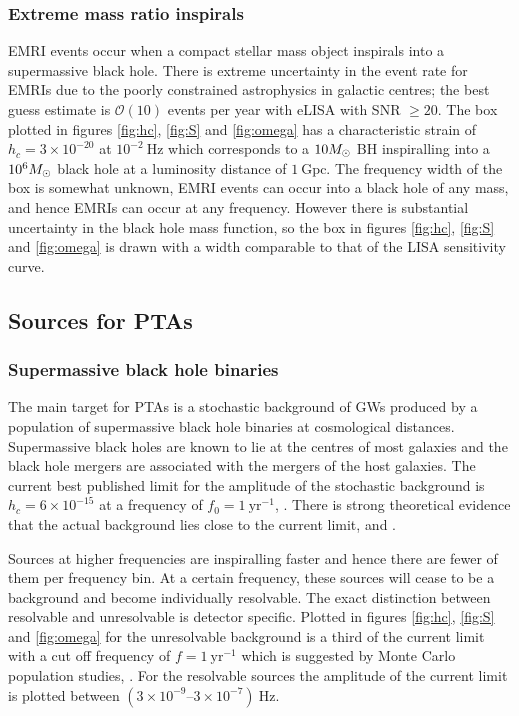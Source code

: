 \subsubsection{Extreme mass ratio inspirals}
EMRI events occur when a compact stellar mass object inspirals into a supermassive black hole. There is extreme uncertainty in the event rate for EMRIs due to the poorly constrained astrophysics in galactic centres; the best guess estimate is ${\mathcal{O}}(10)$ events per year with eLISA with SNR $\ge 20$. The box plotted in figures \ref{fig:hc}, \ref{fig:S} and \ref{fig:omega} has a characteristic strain of $h_{c}=3\times 10^{-20}$ at $10^{-2}~\mathrm{Hz}$ which corresponds to a $10M_{ \odot }$ BH inspiralling into a $10^{6}M_{ \odot }$ black hole at a luminosity distance of $1~\mathrm{Gpc}$. The frequency width of the box is somewhat unknown, EMRI events can occur into a black hole of any mass, and hence EMRIs can occur at any frequency. However there is substantial uncertainty in the black hole mass function, so the box in figures \ref{fig:hc}, \ref{fig:S} and \ref{fig:omega} is drawn with a width comparable to that of the LISA sensitivity curve.




\subsection{Sources for PTAs}

\subsubsection{Supermassive black hole binaries}
The main target for PTAs is a stochastic background of GWs produced by a population of supermassive black hole binaries at cosmological distances. Supermassive black holes are known to lie at the centres of most galaxies and the black hole mergers are associated with the mergers of the host galaxies. The current best published limit for the amplitude of the stochastic background is $h_{c} = 6\times 10^{-15}$ at a frequency of $f_{0}=1~\mathrm{yr}^{-1}$, \cite{Haasteren}. There is strong theoretical evidence that the actual background lies close to the current limit, \cite{imminentdetectionofgravitationalwaves} and \cite{Sesana-2012}. 

Sources at higher frequencies are inspiralling faster and hence there are fewer of them per frequency bin. At a certain frequency, these sources will cease to be a background and become individually resolvable. The exact distinction between resolvable and unresolvable is detector specific. Plotted in figures \ref{fig:hc}, \ref{fig:S} and \ref{fig:omega} for the unresolvable background is a third of the current limit with a cut off frequency of $f=1~\mathrm{yr}^{-1}$ which is suggested by Monte Carlo population studies, \cite{SesanaVecchioColancino}. For the resolvable sources the amplitude of the current limit is plotted between $\left(3\times 10^{-9}\right.$--$\left.3\times 10^{-7}\right)~\mathrm{Hz}$.




